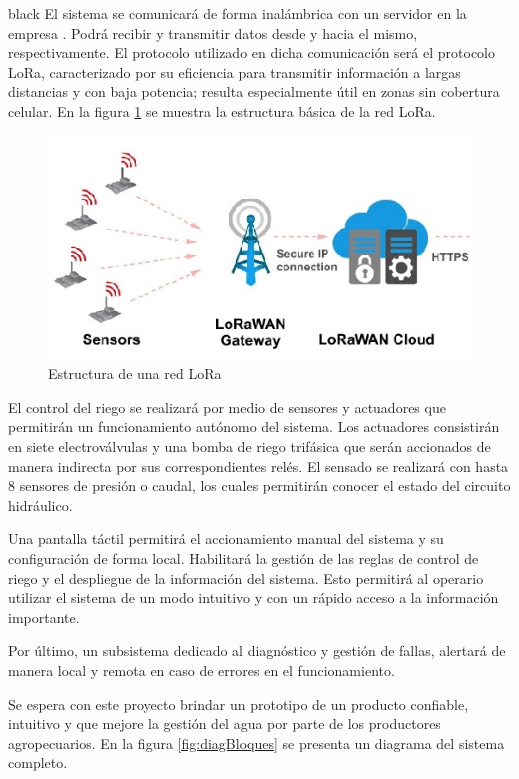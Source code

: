 \documentclass[11pt]{charter}
\begin{document}
\begin{consigna}{black}
El sistema se comunicará de forma inalámbrica con un servidor en la empresa \empclientename . Podrá recibir  y transmitir datos desde y hacia el mismo, respectivamente. El protocolo utilizado en dicha comunicación será el protocolo LoRa, caracterizado por su eficiencia para transmitir información a largas distancias y con baja potencia; resulta especialmente útil en zonas sin cobertura celular. En la figura \ref{fig:redLoRa} se muestra la estructura básica de la red LoRa.

\begin{figure}[htpb]
\centering 
\includegraphics[width=.7\textwidth]{./Figuras/redLora.png}
\caption{Estructura de una red LoRa}
\label{fig:redLoRa}
\end{figure}

El control del riego se realizará por medio de sensores y actuadores que permitirán un funcionamiento autónomo del sistema. Los actuadores consistirán en siete electroválvulas y una bomba de riego trifásica que serán accionados de manera indirecta por sus correspondientes relés. El sensado se realizará con hasta 8 sensores de presión o caudal, los cuales permitirán conocer el estado del circuito hidráulico.

Una pantalla táctil permitirá el accionamiento manual del sistema y su configuración de forma local. Habilitará la gestión de las reglas de control de riego y el despliegue de la información del sistema. Esto permitirá al operario utilizar el sistema de un modo intuitivo y con un rápido acceso a la información importante.

Por último, un subsistema dedicado al diagnóstico y gestión de fallas, alertará de manera local y remota en caso de errores en el funcionamiento.

Se espera con este proyecto brindar un prototipo de un producto confiable, intuitivo y que mejore la gestión del agua por parte de los productores agropecuarios. En la figura \ref{fig:diagBloques} se presenta un diagrama del sistema completo.


\vspace{25px}


\end{consigna}
\end{document}
